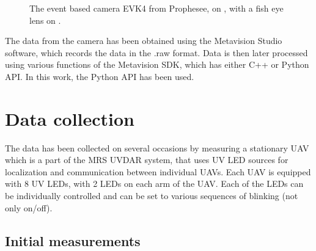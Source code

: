 

\begin{figure}[htbp]
  \centering
  \caption{
The event based camera EVK4 from Prophesee, on , with a fish eye lens on .
}
  \label{fig:evk4}
\end{figure}

The data from the camera has been obtained using the Metavision Studio software, which records the data in the .raw format.
Data is then later processed using various functions of the Metavision SDK, which has either C++ or Python API. In this work,
the Python API has been used.

\section{Data collection}

The data has been collected on several occasions by measuring a stationary UAV which is a part of the MRS UVDAR system, that
uses UV \ac{LED} sources for localization and communication between individual UAVs. 
Each UAV is equipped with 8 UV LEDs, with 2 LEDs on each arm of the UAV. Each of the LEDs can be individually controlled
and can be set to various sequences of blinking (not only on/off).

\subsection{Initial measurements}

